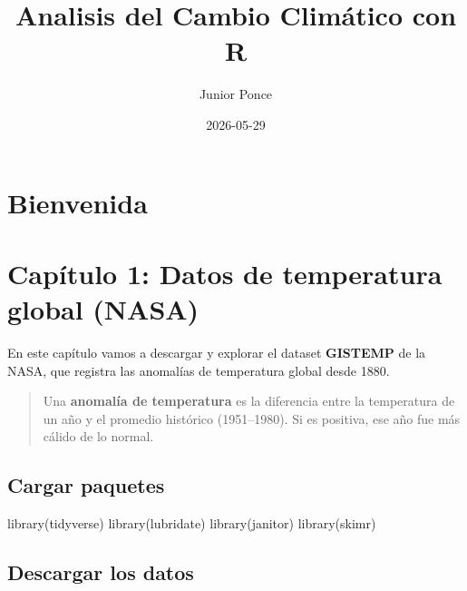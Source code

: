 \documentclass[
  letterpaper,
  DIV=11,
  numbers=noendperiod]{scrreprt}
\title{Analisis del Cambio Climático con R}
\author{Junior Ponce}
\date{2026-05-29}
\newenvironment{Shaded}{\begin{snugshade}}{\end{snugshade}}
\newcommand{\FunctionTok}[1]{\textcolor[rgb]{0.28,0.35,0.67}{#1}}
\newcommand{\NormalTok}[1]{\textcolor[rgb]{0.00,0.23,0.31}{#1}}
\renewcommand*\contentsname{Table of contents}
\newcommand\contentsname{Table of contents}
\begin{document}
\maketitle

\renewcommand*\contentsname{Table of contents}
{
\setcounter{tocdepth}{2}
\tableofcontents
}


\chapter*{Bienvenida}\label{bienvenida}



\chapter{Capítulo 1: Datos de temperatura global
(NASA)}\label{capuxedtulo-1-datos-de-temperatura-global-nasa}

En este capítulo vamos a descargar y explorar el dataset
\textbf{GISTEMP} de la NASA, que registra las anomalías de temperatura
global desde 1880.

\begin{quote}
Una \textbf{anomalía de temperatura} es la diferencia entre la
temperatura de un año y el promedio histórico (1951--1980). Si es
positiva, ese año fue más cálido de lo normal.
\end{quote}

\section{Cargar paquetes}\label{cargar-paquetes}

\begin{Shaded}
\begin{Highlighting}[]
\FunctionTok{library}\NormalTok{(tidyverse)}
\FunctionTok{library}\NormalTok{(lubridate)}
\FunctionTok{library}\NormalTok{(janitor)}
\FunctionTok{library}\NormalTok{(skimr)}
\end{Highlighting}
\end{Shaded}

\section{Descargar los datos}\label{descargar-los-datos}
\end{document}
